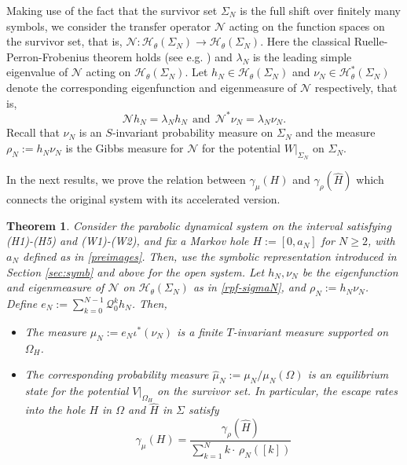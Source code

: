 \documentclass{amsart}
\newtheorem{theorem}{Theorem}[section]
\theoremstyle{definition}
\theoremstyle{remark}
\theoremstyle{definition}
\numberwithin{equation}{section}
\newcommand{\CH}{{\mathcal H}}
\newcommand{\CN}{{\mathcal N}}
\newcommand{\CQ}{{\mathcal Q}}
\newcommand{\CW}{{W}}
\begin{document}
Making use of the fact that the survivor set $\Sigma_{N}$ is the full shift over finitely many symbols, we consider the transfer operator $\CN$ acting on the function spaces on the survivor set, that is, $\CN:\CH_{\theta}(\Sigma_{N}) \to \CH_{\theta}(\Sigma_{N})$. Here the classical Ruelle-Perron-Frobenius theorem holds (see e.g. \cite{PP}) and $\lambda_{N}$ is the leading simple eigenvalue of $\CN$ acting on $\CH_{\theta}(\Sigma_{N})$. Let $h_{N} \in \CH_{\theta}(\Sigma_{N})$ and $ \nu_{N} \in \CH_{\theta}^{*}(\Sigma_{N})$ denote the corresponding eigenfunction and eigenmeasure of $\CN$ respectively, that is,
\begin{equation}\label{rpf-sigmaN} 
        \CN h_{N} = \lambda_{N}h_{N} \ \ \text{and} \ \ \CN^{*}\nu_{N} = \lambda_{N}\nu_{N}.
 \end{equation}
Recall that $\nu_{N} $ is an $S$-invariant probability measure on $\Sigma_{N}$ and the measure $\rho_{N} := h_{N} \nu_{N}$ is the Gibbs measure for $\CN$ for the potential $\CW|_{\Sigma_{N}}$ on $\Sigma_{N}$. 

In the next results, we prove the relation between $\gamma_\mu(H)$ and $\gamma_\rho(\hat{H})$ which connects the original system with its accelerated version.

\begin{theorem} \label{thm:escape_H_hatH}
    Consider the parabolic dynamical system on the interval satisfying (H1)-(H5) and (W1)-(W2), and fix a Markov hole $H:=[0,a_N]$ for $N \ge 2$, with $a_N$ defined as in \eqref{preimages}. Then, use the symbolic representation introduced in Section \ref{sec:symb} and above for the open system. Let $h_{N}, \nu_{N}$ be the eigenfunction and eigenmeasure of $\CN$ on $\CH_{\theta}(\Sigma_{N})$ as in \eqref{rpf-sigmaN}, and $\rho_{N} := h_{N} \nu_{N}$. Define $e_N := \sum_{k=0}^{N-1} \CQ_{0}^{k}h_{N}$. Then,
     \begin{itemize}
         \item[(i)] The measure $\mu_{N} := e_N \iota^*(\nu_{N})$ is a finite $T$-invariant measure supported on $\Omega_{H}$.
         \item[(ii)] The corresponding probability measure $\hat{\mu}_{N} := \mu_{N}/\mu_{N}(\Omega)$ is an equilibrium state for the potential $V|_{\Omega_{H}}$ on the survivor set. In particular, the escape rates into the hole $H$ in $\Omega$ and $\hat{H}$ in $\Sigma$ satisfy 
         \begin{equation} \label{aim-1}
             \gamma_\mu(H) = \frac{\gamma_\rho(\hat{H})}{\sum\limits_{k=1}^{N} k \cdot \, \rho_{N}([k])}
         \end{equation}
     \end{itemize}
\end{theorem}
\end{document}
